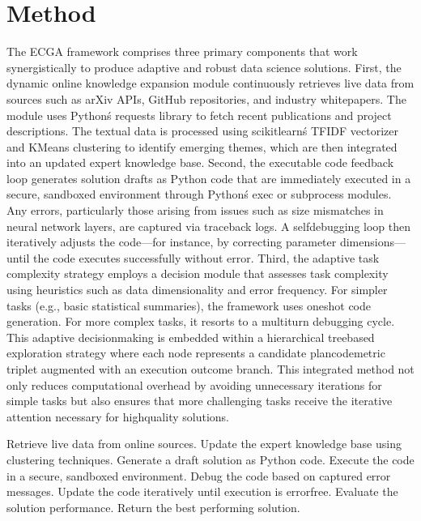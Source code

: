 \documentclass{article} %
\begin{document}
\section{Method}
\label{sec:method}
The ECGA framework comprises three primary components that work synergistically to produce adaptive and robust data science solutions. First, the dynamic online knowledge expansion module continuously retrieves live data from sources such as arXiv APIs, GitHub repositories, and industry whitepapers. The module uses Python\'s requests library\citep{Donoho2006} to fetch recent publications and project descriptions. The textual data is processed using scikit\-learn\'s TF\-IDF vectorizer\citep{Maniezzo1994} and KMeans clustering\citep{Kuan1994} to identify emerging themes, which are then integrated into an updated expert knowledge base. Second, the executable code feedback loop generates solution drafts as Python code that are immediately executed in a secure, sandboxed environment through Python\'s exec or subprocess modules. Any errors, particularly those arising from issues such as size mismatches in neural network layers, are captured via traceback logs. A self\-debugging loop then iteratively adjusts the code—for instance, by correcting parameter dimensions—until the code executes successfully without error. Third, the adaptive task complexity strategy employs a decision module that assesses task complexity using heuristics such as data dimensionality and error frequency. For simpler tasks (e.g., basic statistical summaries), the framework uses one\-shot code generation. For more complex tasks, it resorts to a multi\-turn debugging cycle. This adaptive decision\-making is embedded within a hierarchical tree\-based exploration strategy where each node represents a candidate plan\-code\-metric triplet augmented with an execution outcome branch. This integrated method not only reduces computational overhead by avoiding unnecessary iterations for simple tasks but also ensures that more challenging tasks receive the iterative attention necessary for high\-quality solutions.

\begin{algorithm}
\caption{ECGA Procedure}
\begin{algorithmic}
  \State Retrieve live data from online sources.
  \State Update the expert knowledge base using clustering techniques.
    \State Generate a draft solution as Python code.
    \State Execute the code in a secure, sandboxed environment.
      \State Debug the code based on captured error messages.
      \State Update the code iteratively until execution is error\-free.
    \Else
      \State Evaluate the solution performance.
    \EndIf
  \EndFor
  \State Return the best performing solution.
\end{algorithmic}
\end{algorithm}
\end{document}
